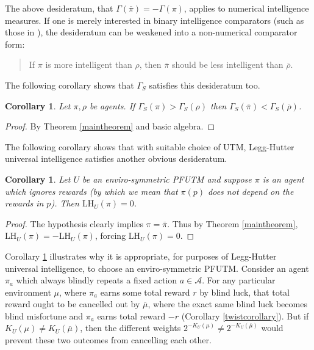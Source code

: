 \documentclass{article}
\newtheorem{corollary}[theorem]{Corollary}
\def\LH{\textrm{LH}}
\def\SYM{S}
\begin{document}
The above desideratum, that $\Gamma(\overline\pi)=-\Gamma(\pi)$, applies to
numerical intelligence measures. If one is merely interested in binary
intelligence comparators (such as those in \cite{alexander2019intelligence}),
the desideratum can be weakened into a non-numerical comparator form:
\begin{quote}
    If $\pi$ is more intelligent than $\rho$,
    then $\overline\pi$ should be less intelligent than $\overline\rho$.
\end{quote}
The following corollary shows that $\Gamma_{\SYM}$ satisfies this desideratum too.

\begin{corollary}
\label{comparatorcorollary}
    Let $\pi,\rho$ be agents. If $\Gamma_{\SYM}(\pi)>\Gamma_{\SYM}(\rho)$
    then $\Gamma_{\SYM}(\overline\pi)<\Gamma_{\SYM}(\overline\rho)$.
\end{corollary}

\begin{proof}
    By Theorem \ref{maintheorem} and basic algebra.
\end{proof}

The following corollary shows that with suitable choice of UTM,
Legg-Hutter universal intelligence satisfies another obvious desideratum.

\begin{corollary}
\label{ignoringrewardscorollary}
    Let $U$ be an enviro-symmetric PFUTM and
    suppose $\pi$ is an agent which ignores rewards (by which we mean that
    $\pi(p)$ does not depend on the rewards in $p$).
    Then $\LH_U(\pi)=0$.
\end{corollary}

\begin{proof}
    The hypothesis clearly implies $\pi=\overline\pi$. Thus by Theorem
    \ref{maintheorem}, $\LH_U(\pi)=-\LH_U(\pi)$,
    forcing $\LH_U(\pi)=0$.
\end{proof}

Corollary \ref{ignoringrewardscorollary} illustrates why it is appropriate, for
purposes of Legg-Hutter universal intelligence, to choose an enviro-symmetric PFUTM.
Consider an agent $\pi_a$
which always blindly repeats a fixed action $a\in\mathcal A$.
For any particular environment $\mu$,
where $\pi_a$ earns some total reward $r$ by blind luck,
that total reward ought to be cancelled out by $\overline\mu$, where
the exact same blind luck becomes blind misfortune and $\pi_a$ earns total reward
$-r$ (Corollary \ref{twistcorollary}). But if $K_U(\mu)\not=K_U(\overline\mu)$,
then the different weights $2^{-K_U(\mu)}\not=2^{-K_U(\overline\mu)}$ would prevent
these two outcomes from cancelling each other.
\end{document}
